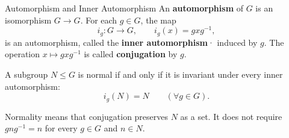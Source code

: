 \documentclass[12pt,a4paper]{article}
\begin{document}
    \begin{defi}{Automorphism and Inner Automorphism}
        An \textbf{automorphism} of $G$ is an isomorphism $G \to G$.
        For each $g \in G$, the map
        \[
            i_g \colon G \to G,
            \qquad
            i_g(x) = gxg^{-1},
        \]
        is an automorphism, called the \textbf{inner automorphism}·
        induced by $g$. The operation $x \mapsto gxg^{-1}$ is called
        \textbf{conjugation} by $g$.
    \end{defi}
    \bigskip
    
    \begin{prop}
        A subgroup $N \le G$ is normal if and only if it is invariant
        under every inner automorphism:
        \[
            i_g(N) = N \qquad (\forall g \in G).
        \]
    \end{prop}
    \bigskip
    
    \begin{remark}
        Normality means that conjugation preserves $N$ as a set.
        It does not require $gng^{-1}=n$ for every $g \in G$ and
        $n \in N$.
    \end{remark}
    \bigskip
\end{document}
